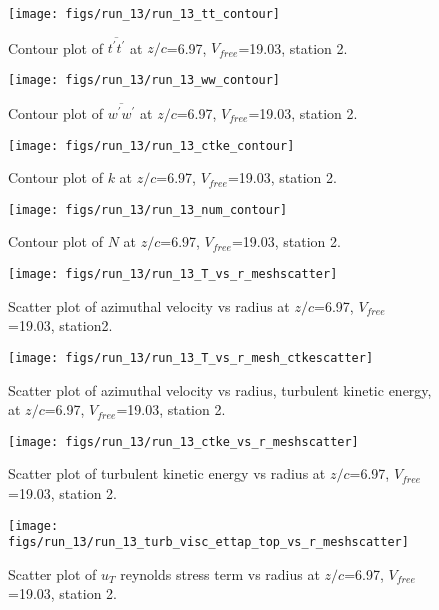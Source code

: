 \begin{figure}[H]
\centering
\texttt{[image: figs/run\_13/run\_13\_tt\_contour]}
\caption{Contour plot of $\overline{t^\prime t^\prime}$ at $z/c$=6.97, $V_{free}$=19.03, station 2.}
\end{figure}


\begin{figure}[H]
\centering
\texttt{[image: figs/run\_13/run\_13\_ww\_contour]}
\caption{Contour plot of $\overline{w^\prime w^\prime}$ at $z/c$=6.97, $V_{free}$=19.03, station 2.}
\end{figure}


\begin{figure}[H]
\centering
\texttt{[image: figs/run\_13/run\_13\_ctke\_contour]}
\caption{Contour plot of $k$ at $z/c$=6.97, $V_{free}$=19.03, station 2.}
\end{figure}


\begin{figure}[H]
\centering
\texttt{[image: figs/run\_13/run\_13\_num\_contour]}
\caption{Contour plot of $N$ at $z/c$=6.97, $V_{free}$=19.03, station 2.}
\end{figure}


\begin{figure}[H]
\centering
\texttt{[image: figs/run\_13/run\_13\_T\_vs\_r\_meshscatter]}
\caption{Scatter plot of azimuthal velocity vs radius at $z/c$=6.97, $V_{free}$=19.03, station2.}
\end{figure}


\begin{figure}[H]
\centering
\texttt{[image: figs/run\_13/run\_13\_T\_vs\_r\_mesh\_ctkescatter]}
\caption{Scatter plot of azimuthal velocity vs radius, turbulent kinetic energy, at $z/c$=6.97, $V_{free}$=19.03, station 2.}
\end{figure}


\begin{figure}[H]
\centering
\texttt{[image: figs/run\_13/run\_13\_ctke\_vs\_r\_meshscatter]}
\caption{Scatter plot of turbulent kinetic energy vs radius at $z/c$=6.97, $V_{free}$=19.03, station 2.}
\end{figure}


\begin{figure}[H]
\centering
\texttt{[image: figs/run\_13/run\_13\_turb\_visc\_ettap\_top\_vs\_r\_meshscatter]}
\caption{Scatter plot of $
u_T$ reynolds stress term vs radius at $z/c$=6.97, $V_{free}$=19.03, station 2.}
\end{figure}


